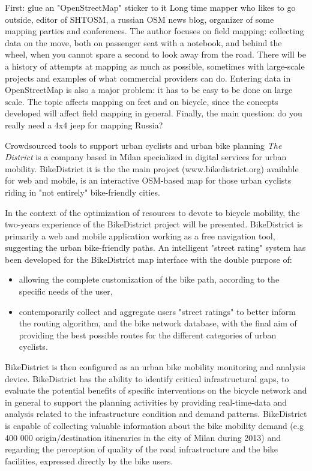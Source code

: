 %
{First: glue an "OpenStreetMap" sticker to it}%
{Long time mapper who likes to go outside, editor of SHTOSM, a russian OSM news blog, organizer of some mapping parties and conferences. }%
{The author focuses on field mapping: collecting data on the move, both on passenger seat with a notebook, and behind the wheel, when you cannot spare a second to look away from the road. There will be a history of attempts at mapping as much as possible, sometimes with large-scale projects and examples of what commercial providers can do. Entering data in OpenStreetMap is also a major problem: it has to be easy to be done on large scale. The topic affects mapping on feet and on bicycle, since the concepts developed will affect field mapping in general. Finally, the main question: do you really need a 4x4 jeep for mapping Russia?}

%
{Crowdsourced tools to support urban cyclists and urban bike planning}%
{\emph{The District} is a company based in Milan specialized in digital services for urban mobility. BikeDistrict it is the the main project (www.bikedistrict.org) available for web and mobile, is an interactive OSM-based map for those urban cyclists riding in "not entirely" bike-friendly cities.}%
{In the context of the optimization of resources to devote to bicycle mobility, the two-years experience of the BikeDistrict project will be presented.
BikeDistrict is primarily a web and mobile application working as a free navigation tool, suggesting the urban bike-friendly paths. 
An intelligent "street rating" system has been developed for the BikeDistrict map interface with the double purpose of:
\begin{itemize}
\item allowing the complete customization of the bike path, according to the specific needs of the user,
\item contemporarily collect and aggregate users "street ratings" to better inform the routing algorithm, and the bike network database, with the final aim of providing the best possible routes for the different categories of urban cyclists. 
\end{itemize}
 
BikeDistrict is then configured as an urban bike mobility monitoring and analysis device. BikeDistrict has the ability to identify critical infrastructural gaps, to evaluate the potential benefits of specific interventions on the bicycle network and in general to support the planning activities by providing real-time-data and analysis related to the infrastructure condition and demand patterns. BikeDistrict is capable of collecting valuable information about the bike mobility demand (e.g 400 000 origin/destination itineraries in the city of Milan during 2013) and regarding the perception of quality of the road infrastructure and the bike facilities, expressed directly by the bike users. }

